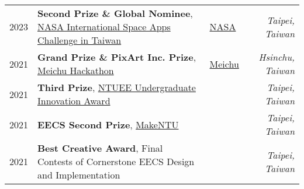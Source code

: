 \begin{tabularx}{\linewidth}{ c l X r@{} }
    2023 & \textbf{Second Prize \& Global Nominee}, \href{https://www.spaceappschallenge.org/2023/locations/taipei/}{NASA International Space Apps Challenge in Taiwan} & \href{https://github.com/NTUEE-325/NASA2023_Hack}{\raisebox{-0.05\height}{\faGithub} NASA} & \textit{Taipei, Taiwan} \\
    2021 & \textbf{Grand Prize \& PixArt Inc. Prize}, \href{https://2021.meichuhackathon.org/}{Meichu Hackathon} & \href{https://github.com/NTUEE-325/hackthon}{\raisebox{-0.05\height}{\faGithub} Meichu} & \textit{Hsinchu, Taiwan} \\
    2021 & \textbf{Third Prize}, \href{https://www.facebook.com/NTUEEUIA/?locale=zh_TW}{NTUEE Undergraduate Innovation Award} & & \textit{Taipei, Taiwan} \\
    2021 & \textbf{EECS Second Prize}, \href{https://make.ntuee.org/post/2021_rules}{MakeNTU} & & \textit{Taipei, Taiwan} \\
    2021 & \textbf{Best Creative Award}, Final Contests of Cornerstone EECS Design and Implementation & & \textit{Taipei, Taiwan} \\
\end{tabularx}
